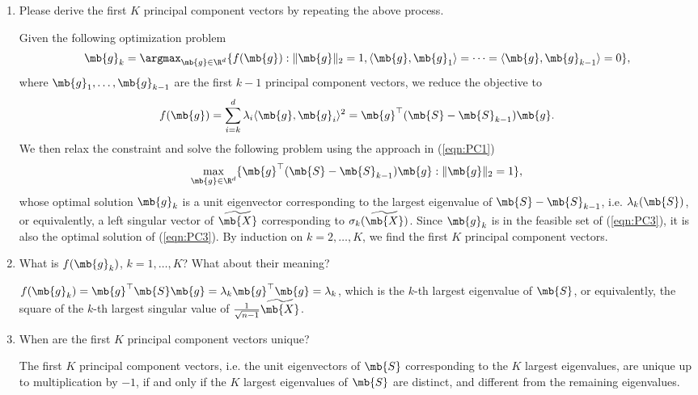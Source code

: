 \begin{exercise}
\begin{enumerate}
        \item Please derive the first $K$ principal component vectors by repeating the above process.
            \begin{solution}
                Given the following optimization problem
                \begin{align}\label{eqn:PC3}
                    \mb{g}_k = \argmax_{\mb{g}\in\R^d}\{f(\mb{g}):\|\mb{g}\|_2=1,\langle\mb{g},\mb{g}_1\rangle=\cdots=\langle\mb{g},\mb{g}_{k-1}\rangle=0\},
                \end{align}
                where $\mb{g}_1,\ldots,\mb{g}_{k-1}$ are the first $k-1$ principal component vectors, we reduce the objective to
                \begin{align*}
                    f(\mb{g}) = \sum_{i=k}^d \lambda_i \langle\mb{g}, \mb{g}_i \rangle^2 = \mb{g}^\top (\mb{S} - \mb{S}_{k-1}) \mb{g}.
                \end{align*}
                We then relax the constraint and solve the following problem using the approach in (\ref{eqn:PC1})
                \begin{align*}
                    \max_{\mb{g}\in\R^d} \{\mb{g}^\top (\mb{S} - \mb{S}_{k-1}) \mb{g}: \|\mb{g}\|_2 = 1\},
                \end{align*}
                whose optimal solution $\mb{g}_k$ is a unit eigenvector corresponding to the largest eigenvalue of $\mb{S} - \mb{S}_{k-1}$, i.e. $\lambda_k(\mb{S})$, or equivalently, a left singular vector of $\widetilde{\mb{X}}$ corresponding to $\sigma_k(\widetilde{\mb{X}})$. Since $\mb{g}_k$ is in the feasible set of (\ref{eqn:PC3}), it is also the optimal solution of (\ref{eqn:PC3}). By induction on $k = 2,\dots,K$, we find the first $K$ principal component vectors.
                \qedhere
            \end{solution}


        \item What is $f(\mb{g}_k)$, $k=1,\ldots,K$? What about their meaning?
            \begin{solution}
                $f(\mb{g}_k) = \mb{g}^\top \mb{S} \mb{g} = \lambda_k \mb{g}^\top \mb{g} = \lambda_k$, which is the $k$-th largest eigenvalue of $\mb{S}$, or equivalently, the square of the $k$-th largest singular value of $\frac{1}{\sqrt{n-1}}\widetilde{\mb{X}}$.
                \qedhere
            \end{solution}

        \item When are the first $K$ principal component vectors unique?
            \begin{solution}
                The first $K$ principal component vectors, i.e. the unit eigenvectors of $\mb{S}$ corresponding to the $K$ largest eigenvalues, are unique up to multiplication by $-1$, if and only if the $K$ largest eigenvalues of $\mb{S}$ are distinct, and different from the remaining eigenvalues.


\end{solution}
\end{enumerate}
\end{exercise}
